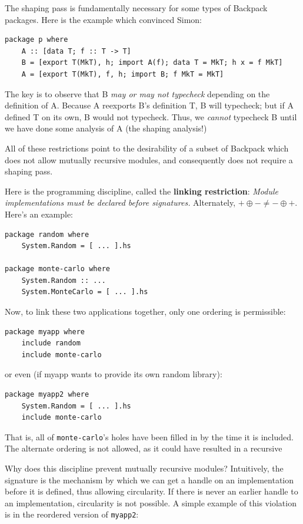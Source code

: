 \documentclass{article}
\begin{document}
The shaping pass is fundamentally necessary for some types of Backpack packages.
Here is the example which convinced Simon:

\begin{verbatim}
package p where
    A :: [data T; f :: T -> T]
    B = [export T(MkT), h; import A(f); data T = MkT; h x = f MkT]
    A = [export T(MkT), f, h; import B; f MkT = MkT]
\end{verbatim}

The key is to observe that B \emph{may or may not typecheck} depending
on the definition of A. Because A reexports B's definition T, B will
typecheck; but if A defined T on its own, B would not typecheck.  Thus,
we \emph{cannot} typecheck B until we have done some analysis of A (the
shaping analysis!)

All of these restrictions point to the desirability of a subset of
Backpack which does not allow mutually recursive modules, and
consequently does not require a shaping pass.

Here is the programming discipline, called the \textbf{linking restriction}: \emph{Module implementations
must be declared before signatures.}  Alternately, $+ \oplus - \neq - \oplus +$.  Here's an example:

\begin{verbatim}
package random where
    System.Random = [ ... ].hs

package monte-carlo where
    System.Random :: ...
    System.MonteCarlo = [ ... ].hs
\end{verbatim}

Now, to link these two applications together, only one ordering
is permissible:

\begin{verbatim}
package myapp where
    include random
    include monte-carlo
\end{verbatim}

or even (if myapp wants to provide its own random library):

\begin{verbatim}
package myapp2 where
    System.Random = [ ... ].hs
    include monte-carlo
\end{verbatim}

That is, all of \verb|monte-carlo|'s holes have been filled in by the time
it is included.  The alternate ordering is not allowed, as it could have
resulted in a recursive 

Why does this discipline prevent mutually recursive modules?  Intuitively,
the signature is the mechanism by which we can get a handle on an implementation
before it is defined, thus allowing circularity. If there is never an earlier handle
to an implementation, circularity is not possible.  A simple example of
this violation is in the reordered version of \verb|myapp2|:
\end{document}
